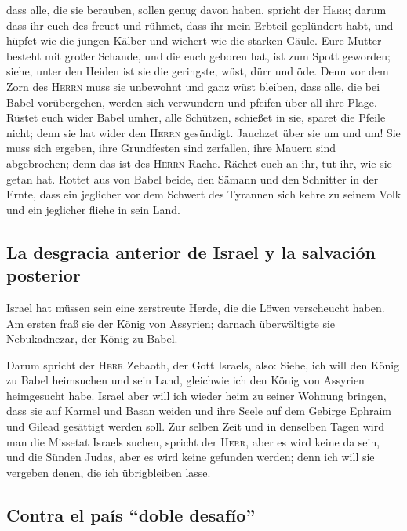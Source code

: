 dass alle, die sie berauben, sollen genug davon haben, spricht der
\textsc{Herr};  darum dass ihr euch des freuet und
rühmet, dass ihr mein Erbteil geplündert habt, und hüpfet wie die jungen
Kälber und wiehert wie die starken Gäule.  Eure Mutter
besteht mit großer Schande, und die euch geboren hat, ist zum Spott
geworden; siehe, unter den Heiden ist sie die geringste, wüst, dürr und
öde.  Denn vor dem Zorn des \textsc{Herrn} muss sie
unbewohnt und ganz wüst bleiben, dass alle, die bei Babel vorübergehen,
werden sich verwundern und pfeifen über all ihre Plage. 
Rüstet euch wider Babel umher, alle Schützen, schießet in sie, sparet
die Pfeile nicht; denn sie hat wider den \textsc{Herrn} gesündigt.
 Jauchzet über sie um und um! Sie muss sich ergeben, ihre
Grundfesten sind zerfallen, ihre Mauern sind abgebrochen; denn das ist
des \textsc{Herrn} Rache. Rächet euch an ihr, tut ihr, wie sie getan
hat.  Rottet aus von Babel beide, den Sämann und den
Schnitter in der Ernte, dass ein jeglicher vor dem Schwert des Tyrannen
sich kehre zu seinem Volk und ein jeglicher fliehe in sein Land.

\hypertarget{la-desgracia-anterior-de-israel-y-la-salvaciuxf3n-posterior}{%
\subsection{La desgracia anterior de Israel y la salvación
posterior}\label{la-desgracia-anterior-de-israel-y-la-salvaciuxf3n-posterior}}

 Israel hat müssen sein eine zerstreute Herde, die die
Löwen verscheucht haben. Am ersten fraß sie der König von Assyrien;
darnach überwältigte sie Nebukadnezar, der König zu Babel.

 Darum spricht der \textsc{Herr} Zebaoth, der Gott
Israels, also: Siehe, ich will den König zu Babel heimsuchen und sein
Land, gleichwie ich den König von Assyrien heimgesucht habe.
 Israel aber will ich wieder heim zu seiner Wohnung
bringen, dass sie auf Karmel und Basan weiden und ihre Seele auf dem
Gebirge Ephraim und Gilead gesättigt werden soll.  Zur
selben Zeit und in denselben Tagen wird man die Missetat Israels suchen,
spricht der \textsc{Herr}, aber es wird keine da sein, und die Sünden
Judas, aber es wird keine gefunden werden; denn ich will sie vergeben
denen, die ich übrigbleiben lasse.

\hypertarget{contra-el-pauxeds-doble-desafuxedo}{%
\subsection{Contra el país ``doble
desafío''}\label{contra-el-pauxeds-doble-desafuxedo}}

